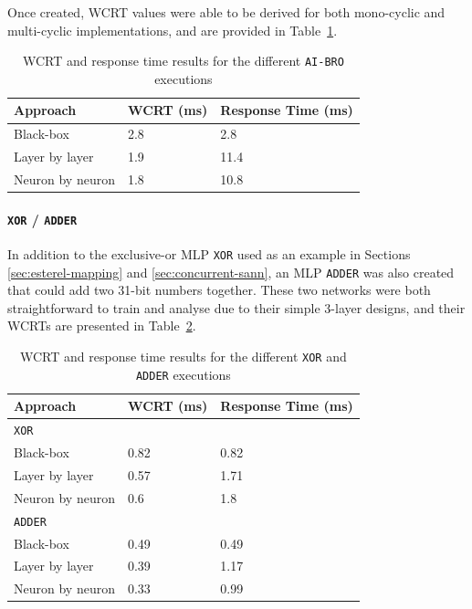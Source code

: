 

Once created, \ac{WCRT} values were able to be derived for both mono-cyclic and multi-cyclic implementations, and are provided in Table~\ref{tbl:res-aibro}.

\begin{table}[h]
	\centering
	\caption{\ac{WCRT} and response time results for the different \texttt{AI-BRO} executions}
	\label{tbl:res-aibro}
	\begin{tabular}{|l|l|l|}
		\hline
		Approach         & WCRT (ms) & Response Time (ms)\\ \hline
		Black-box        & 2.8  & 2.8  \\ 
		Layer by layer   & 1.9  & 11.4 \\ 
		Neuron by neuron & 1.8  & 10.8 \\ \hline
	\end{tabular}
\end{table}


\paragraph{\texttt{XOR} / \texttt{ADDER}}
\label{sec:xor-and-adder}

In addition to the exclusive-or \ac{MLP} \texttt{XOR} used as an example in Sections
\ref{sec:esterel-mapping} and \ref{sec:concurrent-sann},
an \ac{MLP} \texttt{ADDER} was also created that could add two 31-bit numbers together. 
These two networks were both straightforward to train and analyse 
due to their simple 3-layer designs, and their \acp{WCRT} are presented in Table~\ref{tbl:res-xor-adder}.

\begin{table}[h]
	\centering
	\caption{\ac{WCRT} and response time results for the different \texttt{XOR} and \texttt{ADDER} executions}
	\label{tbl:res-xor-adder}
	\begin{tabular}{|l|l|l|}
		\hline
		Approach         & WCRT (ms) & Response Time (ms)\\ \hline
		\multicolumn{3}{|l|}{\texttt{XOR}}  \\ \hline
		Black-box        & 0.82 & 0.82   \\ 
		Layer by layer   & 0.57 & 1.71  \\ 
		Neuron by neuron & 0.6  & 1.8 \\  \hline
		\multicolumn{3}{|l|}{\texttt{ADDER}}  \\ \hline
		Black-box        & 0.49 & 0.49   \\ 
		Layer by layer   & 0.39 & 1.17  \\ 
		Neuron by neuron & 0.33 & 0.99 \\  \hline
	\end{tabular}
\end{table}

